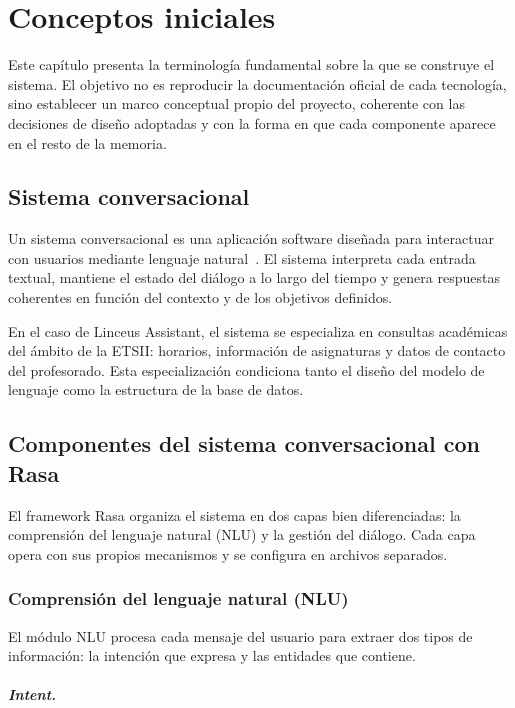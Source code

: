 \chapter{Conceptos iniciales}
\label{cap:conceptos}

Este capítulo presenta la terminología fundamental sobre la que se construye el sistema. El objetivo no es reproducir la documentación oficial de cada tecnología, sino establecer un marco conceptual propio del proyecto, coherente con las decisiones de diseño adoptadas y con la forma en que cada componente aparece en el resto de la memoria.

\section{Sistema conversacional}
\label{sec:sistema-conversacional}

Un sistema conversacional es una aplicación software diseñada para interactuar con usuarios mediante lenguaje natural~\cite{jurafsky2009speech}. El sistema interpreta cada entrada textual, mantiene el estado del diálogo a lo largo del tiempo y genera respuestas coherentes en función del contexto y de los objetivos definidos.

En el caso de Linceus Assistant, el sistema se especializa en consultas académicas del ámbito de la ETSII: horarios, información de asignaturas y datos de contacto del profesorado. Esta especialización condiciona tanto el diseño del modelo de lenguaje como la estructura de la base de datos.

\section{Componentes del sistema conversacional con Rasa}
\label{sec:conceptos-rasa}

El framework Rasa organiza el sistema en dos capas bien diferenciadas: la comprensión del lenguaje natural (NLU) y la gestión del diálogo. Cada capa opera con sus propios mecanismos y se configura en archivos separados.

\subsection{Comprensión del lenguaje natural (NLU)}

El módulo NLU procesa cada mensaje del usuario para extraer dos tipos de información: la intención que expresa y las entidades que contiene.

\paragraph{Intent.}

